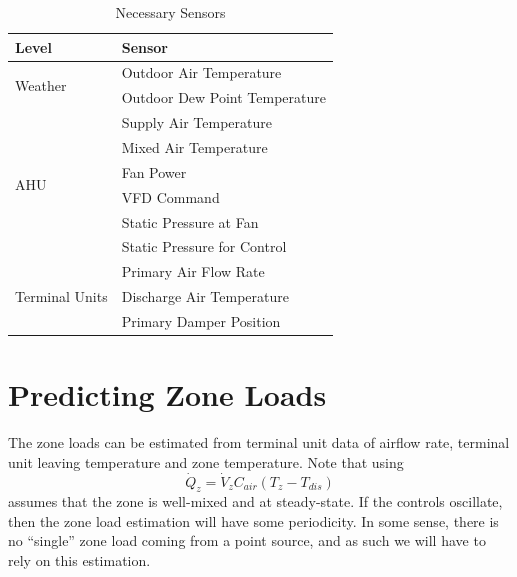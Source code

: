 \begin{table}
\centering
\begin{tabular}{l l}
\toprule

Level & Sensor \\
\midrule\midrule
\multirow{2}{*}{Weather} & Outdoor Air Temperature \\
 & Outdoor Dew Point Temperature \\

 \midrule

\multirow{6}{*}{AHU}              & Supply Air Temperature      \\
                                  & Mixed Air Temperature       \\
                                  & Fan Power                   \\
                                  & VFD Command                 \\
                                  & Static Pressure at Fan      \\
                                  & Static Pressure for Control \\
\midrule
\multirow{4}{*}{Terminal Units}   & Primary Air Flow Rate       \\
                                  & Discharge Air Temperature   \\
                                  & Primary Damper Position     \\

\bottomrule

\end{tabular}
\caption{Necessary Sensors}
\label{tab:NecessarySensors}
\end{table}

\section{Predicting Zone Loads}

The zone loads can be estimated from terminal unit data of airflow rate,
terminal unit leaving temperature and zone temperature. Note that using
%
\begin{equation} \dot Q_{z} = \dot V_{z} C_{air} \left(T_{z}-T_{dis} \right) \end{equation}
%
assumes that the zone is well-mixed and at steady-state. If the
controls oscillate, then the zone load estimation will have some
periodicity. In some sense, there is no ``single'' zone load coming from
a point source, and as such we will have to rely on this estimation.

